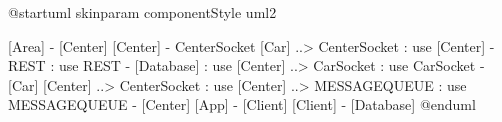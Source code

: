 @startuml
skinparam componentStyle uml2

[Area] - [Center]
[Center] - CenterSocket
[Car] ..> CenterSocket : use
[Center] - REST : use
REST - [Database] : use
[Center] ..> CarSocket : use
CarSocket - [Car]
[Center] ..> CenterSocket : use
[Center] ..> MESSAGEQUEUE : use
MESSAGEQUEUE - [Center]
[App] - [Client]
[Client] - [Database]
@enduml